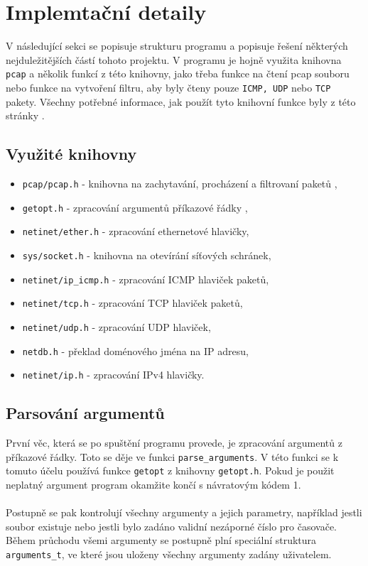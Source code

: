 \documentclass[12pt]{article}
\begin{document}
\pagebreak
\section{Implemtační detaily}
V následující sekci se popisuje strukturu programu a popisuje řešení některých nejduležitějších částí tohoto projektu.
V programu je hojně využita knihovna \texttt{pcap} a několik funkcí z této knihovny, jako třeba funkce na čtení pcap souboru nebo funkce
na vytvoření filtru, aby byly čteny pouze \texttt{ICMP, UDP} nebo \texttt{TCP} pakety. Všechny potřebné informace, jak použít tyto knihovní funkce byly z této stránky \cite{pcap}. 
\subsection*{Využité knihovny}
\begin{itemize}
	\item \texttt{pcap/pcap.h} - knihovna na zachytavání, procházení a filtrovaní paketů \cite{Pcapman}, 
	\item \texttt{getopt.h} - zpracování argumentů příkazové řádky \cite{ARG},
	\item \texttt{netinet/ether.h} - zpracování ethernetové hlavičky, 
	\item \texttt{sys/socket.h} - knihovna na otevírání síťových schránek,
	\item \texttt{netinet/ip\_icmp.h} - zpracování ICMP hlaviček paketů,
	\item \texttt{netinet/tcp.h} - zpracování TCP hlaviček paketů,
	\item \texttt{netinet/udp.h} - zpracování UDP hlaviček,
	\item \texttt{netdb.h} - překlad doménového jména na IP adresu,
	\item \texttt{netinet/ip.h} - zpracování IPv4 hlavičky.
\end{itemize}
\subsection{Parsování argumentů}
První věc, která se po spuštění programu provede, je zpracování argumentů z příkazové řádky. Toto se děje ve funkci \texttt{parse\_arguments}. V této funkci se k tomuto účelu používá funkce 
\texttt{getopt} z knihovny \texttt{getopt.h}. Pokud je použit neplatný argument program okamžite končí s návratovým kódem 1. 
\\\\
Postupně se pak kontrolují všechny argumenty a jejich parametry, například jestli soubor existuje nebo jestli bylo zadáno validní nezáporné číslo pro časovače.
Během průchodu všemi argumenty se postupně plní speciální struktura \texttt{arguments\_t}, ve které jsou uloženy všechny argumenty zadány uživatelem.
\end{document}
